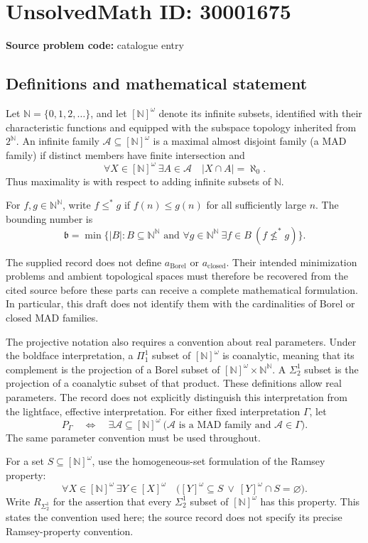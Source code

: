 \documentclass[11pt]{article}
\newcommand{\N}{\mathbb{N}}
\begin{document}
\section*{UnsolvedMath ID: 30001675}
\textbf{Source problem code:} catalogue entry
\subsection{Definitions and mathematical statement}
Let \(\N=\{0,1,2,\ldots\}\), and let \([\N]^\omega\) denote its infinite subsets, identified with their characteristic functions and equipped with the subspace topology inherited from \(2^{\N}\). An infinite family \(\mathcal A\subseteq[\N]^\omega\) is a maximal almost disjoint family (a MAD family) if distinct members have finite intersection and
\[
\forall X\in[\N]^\omega\ \exists A\in\mathcal A\quad |X\cap A|=\aleph_0.
\]
Thus maximality is with respect to adding infinite subsets of \(\N\).

For \(f,g\in\N^{\N}\), write \(f\leq^*g\) if \(f(n)\leq g(n)\) for all sufficiently large \(n\). The bounding number is
\[
\mathfrak b=\min\bigl\{|B|:B\subseteq\N^{\N}\text{ and }\forall g\in\N^{\N}\ \exists f\in B\ (f\not\leq^*g)\bigr\}.
\]

The supplied record does not define \(a_{\mathrm{Borel}}\) or \(a_{\mathrm{closed}}\). Their intended minimization problems and ambient topological spaces must therefore be recovered from the cited source before these parts can receive a complete mathematical formulation. In particular, this draft does not identify them with the cardinalities of Borel or closed MAD families.

The projective notation also requires a convention about real parameters. Under the boldface interpretation, a \(\Pi^1_1\) subset of \([\N]^\omega\) is coanalytic, meaning that its complement is the projection of a Borel subset of \([\N]^\omega\times\N^{\N}\). A \(\Sigma^1_2\) subset is the projection of a coanalytic subset of that product. These definitions allow real parameters. The record does not explicitly distinguish this interpretation from the lightface, effective interpretation. For either fixed interpretation \(\Gamma\), let
\[
P_{\Gamma}\quad\Longleftrightarrow\quad
\exists\mathcal A\subseteq[\N]^\omega\ 
\bigl(\mathcal A\text{ is a MAD family and }\mathcal A\in\Gamma\bigr).
\]
The same parameter convention must be used throughout.

For a set \(S\subseteq[\N]^\omega\), use the homogeneous-set formulation of the Ramsey property:
\[
\forall X\in[\N]^\omega\ \exists Y\in[X]^\omega\quad
\bigl([Y]^\omega\subseteq S\ \lor\ [Y]^\omega\cap S=\varnothing\bigr).
\]
Write \(R_{\Sigma^1_2}\) for the assertion that every \(\Sigma^1_2\) subset of \([\N]^\omega\) has this property. This states the convention used here; the source record does not specify its precise Ramsey-property convention.
\end{document}
